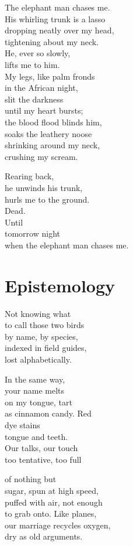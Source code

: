 \documentclass[twoside,10pt]{book}
\begin{document}
The elephant man chases me.\\
His whirling trunk is a lasso\\
dropping neatly over my head,\\
tightening about my neck.\\
He, ever so slowly,\\
lifts me to him.\\
My legs, like palm fronds\\
in the African night,\\
slit the darkness\\
until my heart bursts;\\
the blood flood blinds him,\\
soaks the leathery noose\\
shrinking around my neck,\\
crushing my scream.

Rearing back,\\
he unwinds his trunk,\\
hurls me to the ground.\\
Dead.\\
Until\\
tomorrow night\\
when the elephant man chases me.


\clearpage
\section{Epistemology}

Not knowing what\\
to call those two birds\\
by name, by species,\\
indexed in field guides,\\
lost alphabetically.

In the same way,\\
your name melts\\
on my tongue, tart\\
as cinnamon candy. Red\\
dye stains\\
tongue and teeth.\\
Our talks, our touch\\
too tentative, too full

of nothing but\\
sugar, spun at high speed,\\
puffed with air, not enough\\
to grab onto. Like planes,\\
our marriage recycles oxygen,\\
dry as old arguments.
\end{document}
